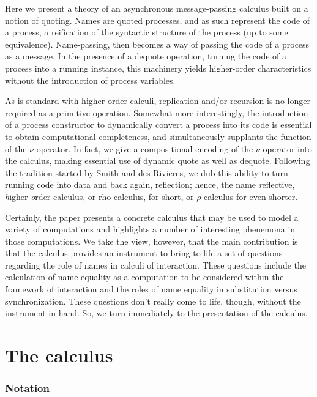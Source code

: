 \documentclass[]{entcs}
\begin{document}
Here we present a theory of an asynchronous message-passing calculus
built on a notion of quoting. Names are quoted processes, and as such
represent the code of a process, a reification of the syntactic
structure of the process (up to some equivalence). Name-passing, then
becomes a way of passing the code of a process as a message. In the
presence of a dequote operation, turning the code of a process into a
running instance, this machinery yields higher-order characteristics
without the introduction of process variables.

As is standard with higher-order calculi, replication and/or recursion
is no longer required as a primitive operation. Somewhat more
interestingly, the introduction of a process constructor to
dynamically convert a process into its code is essential to obtain
computational completeness, and simultaneously supplants the function
of the $\nu$ operator. In fact, we give a compositional encoding of
the $\nu$ operator into the calculus, making essential use of dynamic
quote as well as dequote. Following the tradition started by Smith and
des Rivieres, \cite{lisp3} we dub this ability to turn running code
into data and back again, reflection; hence, the name
\textit{r}eflective,
\textit{h}igher-\textit{o}rder calculus, or rho-calculus, for short,
or $\rho$-calculus for even shorter.

Certainly, the paper presents a concrete calculus that may be used to
model a variety of computations and highlights a number of interesting
phenemona in those computations. We take the view, however, that the
main contribution is that the calculus provides an instrument to bring
to life a set of questions regarding the role of names in calculi of
interaction. These questions include the calculation of name equality
as a computation to be considered within the framework of interaction
and the roles of name equality in substitution versus
synchronization. These questions don't really come to life, though,
without the instrument in hand. So, we turn immediately to the
presentation of the calculus.


\section{The calculus}

\subsubsection{Notation}
\end{document}

